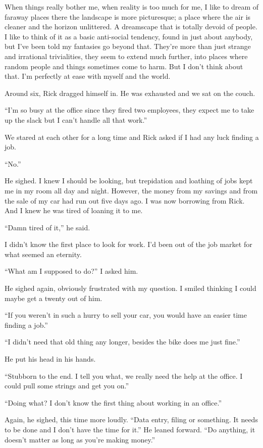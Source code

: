 When things really bother me, when reality is too much for me, I like to
dream of faraway places there the landscape is more picturesque; a place
where the air is cleaner and the horizon unlittered. A dreamscape that
is totally devoid of people. I like to think of it as a basic
anti-social tendency, found in just about anybody, but I've been told my
fantasies go beyond that. They're more than just strange and irrational
trivialities, they seem to extend much further, into places where random
people and things sometimes come to harm. But I don't think about that.
I'm perfectly at ease with myself and the world.

Around six, Rick dragged himself in. He was exhausted and we sat on the
couch.

``I'm so busy at the office since they fired two employees, they expect
me to take up the slack but I can't handle all that work.''

We stared at each other for a long time and Rick asked if I had any luck
finding a job.

``No.''

He sighed. I knew I should be looking, but trepidation and loathing of
jobs kept me in my room all day and night. However, the money from my
savings and from the sale of my car had run out five days ago. I was now
borrowing from Rick. And I knew he was tired of loaning it to me.

``Damn tired of it,'' he said.

I didn't know the first place to look for work. I'd been out of the job
market for what seemed an eternity.

``What am I supposed to do?'' I asked him.

He sighed again, obviously frustrated with my question. I smiled
thinking I could maybe get a twenty out of him.

``If you weren't in such a hurry to sell your car, you would have an
easier time finding a job.''

``I didn't need that old thing any longer, besides the bike does me just
fine.''

He put his head in his hands.

``Stubborn to the end. I tell you what, we really need the help at the
office. I could pull some strings and get you on.''

``Doing what? I don't know the first thing about working in an office.''

Again, he sighed, this time more loudly. ``Data entry, filing or
something. It needs to be done and I don't have the time for it.'' He
leaned forward. ``Do anything, it doesn't matter as long as you're
making money.''

